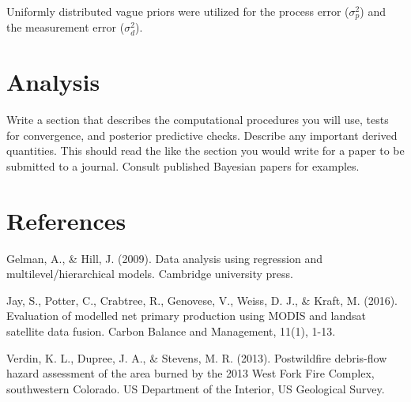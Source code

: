 \documentclass[
]{article}
\begin{document}
Uniformly distributed vague priors were utilized for the process error
(\(\sigma^{2}_{p}\)) and the measurement error (\(\sigma^{2}_{d}\)).

\hypertarget{analysis}{%
\section{Analysis}\label{analysis}}

Write a section that describes the computational procedures you will
use, tests for convergence, and posterior predictive checks. Describe
any important derived quantities. This should read the like the section
you would write for a paper to be submitted to a journal. Consult
published Bayesian papers for examples.

\newpage

\hypertarget{references}{%
\section{References}\label{references}}

Gelman, A., \& Hill, J. (2009). Data analysis using regression and
multilevel/hierarchical models. Cambridge university press.

Jay, S., Potter, C., Crabtree, R., Genovese, V., Weiss, D. J., \& Kraft,
M. (2016). Evaluation of modelled net primary production using MODIS and
landsat satellite data fusion. Carbon Balance and Management, 11(1),
1-13.

Verdin, K. L., Dupree, J. A., \& Stevens, M. R. (2013). Postwildfire
debris-flow hazard assessment of the area burned by the 2013 West Fork
Fire Complex, southwestern Colorado. US Department of the Interior, US
Geological Survey.
\end{document}
